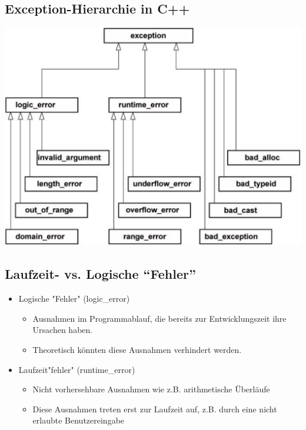 \begin{multicols}{2}
\subsection{Exception-Hierarchie in C++}
\includegraphics[width=0.8\linewidth]{images/exceptionHierarchie.png}
\vfill\null
\columnbreak
\subsection{Laufzeit- vs. Logische "`Fehler"'}
\begin{itemize}
	\item Logische "Fehler" (logic\_error)
	\begin{itemize}
		\item Ausnahmen im Programmablauf, die bereits zur Entwicklungszeit ihre Ursachen haben.
		\item Theoretisch könnten diese Ausnahmen verhindert werden.
	\end{itemize}
	\item Laufzeit"fehler" (runtime\_error)
	\begin{itemize}
		\item Nicht vorhersehbare Ausnahmen wie z.B. arithmetische Überläufe
		\item Diese Ausnahmen treten erst zur Laufzeit auf, z.B. durch eine nicht erlaubte Benutzereingabe
	\end{itemize}
\end{itemize}
\end{multicols}

